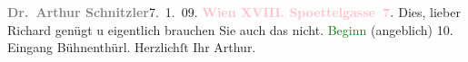            {\bigskip}\pstart
           \noindent{}{\pb}\textcolor{gray}{\textbf{Dr. Arthur Schnitzler}}\hfill 7. 1. 09.\pend
           \pstart
           \textcolor{gray}{\textbf{\textcolor{pink}{Wien XVIII. Spoettelgasse 7}{}\ledrightnote{\textcolor{pink}{Edmund-Weiß-Gasse}}.}}\pend
           \pstart
           Dies, lieber Richard genügt u eigentlich brauchen Sie auch das nicht. \textcolor{green}{Beginn}{} (angeblich)
               10. Eingang Bühnenthürl. Herzlichſt Ihr\pend
           \pstart \spacefill\mbox{Arthur.}\pend{}\endnumbering{}  
      